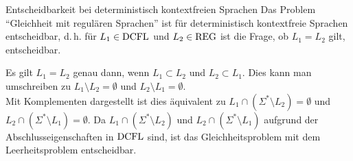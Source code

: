 \linie

\begin{Satz}{Entscheidbarkeit bei deterministisch kontextfreien Sprachen}
    Das Problem "`Gleichheit mit regulären Sprachen"' ist für deterministisch
    kontextfreie Sprachen entscheidbar, d.\,h.
    für $L_1 \in \text{DCFL}$ und $L_2 \in \text{REG}$ ist die Frage, ob
    $L_1 = L_2$ gilt, entscheidbar.
\end{Satz}

\begin{Beweis}
    Es gilt $L_1 = L_2$ genau dann, wenn
    $L_1 \subset L_2$ und $L_2 \subset L_1$.
    Dies kann man umschreiben zu $L_1 \setminus L_2 = \emptyset$ und
    $L_2 \setminus L_1 = \emptyset$.\\
    Mit Komplementen dargestellt ist dies äquivalent zu
    $L_1 \cap (\Sigma^\ast \setminus L_2) = \emptyset$ und
    $L_2 \cap (\Sigma^\ast \setminus L_1) = \emptyset$.
    Da $L_1 \cap (\Sigma^\ast \setminus L_2)$ und
    $L_2 \cap (\Sigma^\ast \setminus L_1)$ aufgrund der Abschlusseigenschaften
    in $\text{DCFL}$ sind, ist das Gleichheitsproblem mit dem Leerheitsproblem
    entscheidbar.
\end{Beweis}

\pagebreak
